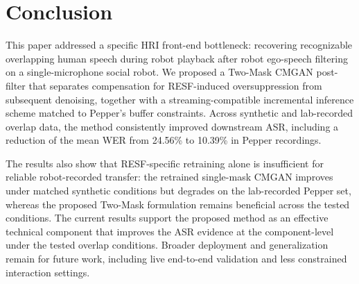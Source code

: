 \documentclass[manuscript,screen,review]{acmart}
\begin{document}
\section{Conclusion}

This paper addressed a specific HRI front-end bottleneck: recovering recognizable overlapping human speech during robot playback after robot ego-speech filtering on a single-microphone social robot. We proposed a Two-Mask CMGAN post-filter that separates compensation for RESF-induced oversuppression from subsequent denoising, together with a streaming-compatible incremental inference scheme matched to Pepper's buffer constraints. Across synthetic and lab-recorded overlap data, the method consistently improved downstream ASR, including a reduction of the mean WER from 24.56\% to 10.39\% in Pepper recordings.

The results also show that RESF-specific retraining alone is insufficient for reliable robot-recorded transfer: the retrained single-mask CMGAN improves under matched synthetic conditions but degrades on the lab-recorded Pepper set, whereas the proposed Two-Mask formulation remains beneficial across the tested conditions. The current results support the proposed method as an effective technical component that improves the ASR evidence at the component-level under the tested overlap conditions. Broader deployment and generalization remain for future work, including live end-to-end validation and less constrained interaction settings.


\end{document}
